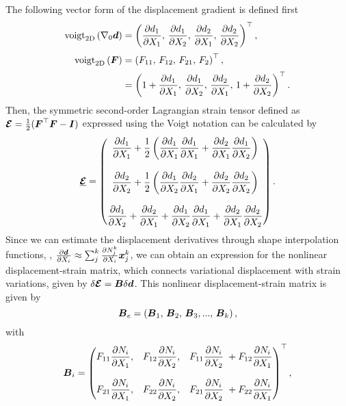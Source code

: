 The following vector form of the displacement gradient is defined first
\begin{align}
\textrm{voigt}_{\textrm{2D}} \left(\nabla_0 {\boldsymbol{d}} \right) & = \left( \frac{\partial d_1}{\partial X_1},\,\frac{\partial d_1}{\partial X_2},\, \frac{\partial d_2}{\partial X_1},\, \frac{\partial d_2}{\partial X_2}\right)^\top, \\[0.25em]
\textrm{voigt}_{\textrm{2D}} \left({\boldsymbol{F}}\right) & = \left( F_{11},\,F_{12},\, F_{21},\,F_{2} \right)^\top, \notag \\[0.15em] & = \left( 1 + \frac{\partial d_1}{\partial X_1},\,\frac{\partial d_1}{\partial X_2},\, \frac{\partial d_2}{\partial X_1},\,  1 + \frac{\partial d_2}{\partial X_2}\right)^\top.
\label{eq:app:C3:F} 
\end{align}
%
Then, the symmetric second-order Lagrangian strain tensor defined as ${\boldsymbol{\mathcal{E}}} = \frac{1}{2}({\boldsymbol{F}}^\top {\boldsymbol{F}} - \boldsymbol{I})$ expressed using the Voigt notation can be calculated by
%
\begin{equation}
 \underline{\boldsymbol{\mathcal{E}}} = \begin{pmatrix}
\dfrac{\partial d_1}{\partial X_1} + \dfrac{1}{2} \left(\dfrac{\partial d_1}{\partial X_1}\dfrac{\partial d_1}{\partial X_1} + \dfrac{\partial d_2}{\partial X_1}\dfrac{\partial d_1}{\partial X_2} \right) \\[0.25em] \\
\dfrac{\partial d_2}{\partial X_2} + \dfrac{1}{2} \left(\dfrac{\partial d_1}{\partial X_2}\dfrac{\partial d_2}{\partial X_1} + \dfrac{\partial d_2}{\partial X_2}\dfrac{\partial d_2}{\partial X_2} \right) \\[0.25em] \\
\dfrac{\partial d_1}{\partial X_2} + \dfrac{\partial d_2}{\partial X_1} + \dfrac{\partial d_1}{\partial X_2}\dfrac{\partial d_1}{\partial X_1} + \dfrac{\partial d_2}{\partial X_1}\dfrac{\partial d_2}{\partial X_2}
 \end{pmatrix}.
\end{equation}
%
Since we can estimate the displacement derivatives through shape interpolation functions, \ie, $\frac{\partial {\boldsymbol{d}}}{\partial X_i} \approx \sum_{j}^k \frac{\partial N_{j}^k}{\partial X_i}{\boldsymbol{x}}^k_j$, we can obtain an expression for the nonlinear displacement-strain matrix, which connects variational displacement with strain variations, given by $\delta \boldsymbol{\mathcal{E}} = {\boldsymbol{B}} \delta {\boldsymbol{d}}$. This nonlinear displacement-strain matrix is given by
\begin{equation}
{\boldsymbol{B}}_{e} = \left({\boldsymbol{B}}_1,\,{\boldsymbol{B}}_2,\,{\boldsymbol{B}}_3, ...,\, {\boldsymbol{B}}_{k} \right),
\label{eq:app:C3:straindisplacementmatrix}
\end{equation}
with
\begin{align}
{\boldsymbol{B}}_i = \begin{pmatrix} 
F_{11} \dfrac{\partial N_{i}}{\partial X_1}, & F_{12}  \dfrac{\partial N_{i}}{\partial X_2}, &  F_{11}  \dfrac{\partial N_{i}}{\partial X_2}  \; + F_{12} \dfrac{\partial N_{i}}{\partial X_1} \\[0.25em] \\
F_{21}  \dfrac{\partial N_{i}}{\partial X_1},  & F_{22}  \dfrac{\partial N_{i}}{\partial X_2}, & F_{21}  \dfrac{\partial N_{i}}{\partial X_2} \; + F_{22}  \dfrac{\partial N_{i}}{\partial X_1}  
\end{pmatrix}^\top,
\end{align}
